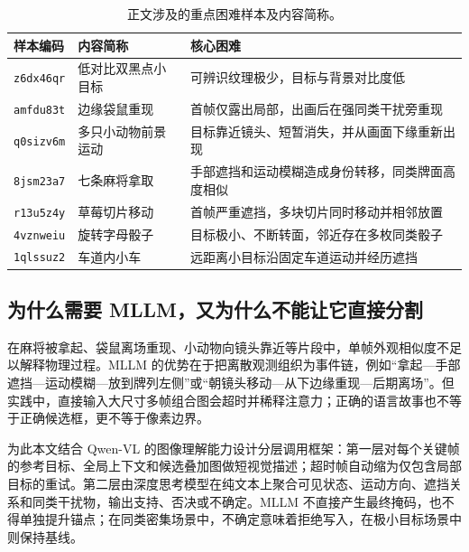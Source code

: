 \documentclass[11pt,a4paper,oneside]{ctexart}
\newcommand{\code}[1]{\texttt{#1}}
\begin{document}
\begin{table}[H]
\centering
\caption{正文涉及的重点困难样本及内容简称。}
\label{tab:video-codes}
\small
\renewcommand{\arraystretch}{1.14}
\begin{tabularx}{\textwidth}{>{\raggedright\arraybackslash}p{2.25cm} >{\raggedright\arraybackslash}p{3.8cm} >{\raggedright\arraybackslash}X}
\toprule
样本编码 & 内容简称 & 核心困难 \\
\midrule
\code{z6dx46qr} & 低对比双黑点小目标 & 可辨识纹理极少，目标与背景对比度低 \\
\code{amfdu83t} & 边缘袋鼠重现 & 首帧仅露出局部，出画后在强同类干扰旁重现 \\
\code{q0sizv6m} & 多只小动物前景运动 & 目标靠近镜头、短暂消失，并从画面下缘重新出现 \\
\code{8jsm23a7} & 七条麻将拿取 & 手部遮挡和运动模糊造成身份转移，同类牌面高度相似 \\
\code{r13u5z4y} & 草莓切片移动 & 首帧严重遮挡，多块切片同时移动并相邻放置 \\
\code{4vznweiu} & 旋转字母骰子 & 目标极小、不断转面，邻近存在多枚同类骰子 \\
\code{1qlssuz2} & 车道内小车 & 远距离小目标沿固定车道运动并经历遮挡 \\
\bottomrule
\end{tabularx}
\end{table}

\subsection{为什么需要 MLLM，又为什么不能让它直接分割}
在麻将被拿起、袋鼠离场重现、小动物向镜头靠近等片段中，单帧外观相似度不足以解释物理过程。MLLM 的优势在于把离散观测组织为事件链，例如“拿起—手部遮挡—运动模糊—放到牌列左侧”或“朝镜头移动—从下边缘重现—后期离场”。但实践中，直接输入大尺寸多帧组合图会超时并稀释注意力；正确的语言故事也不等于正确候选框，更不等于像素边界。

为此本文结合 Qwen-VL 的图像理解能力\cite{bai2025qwen25vl}设计分层调用框架：第一层对每个关键帧的参考目标、全局上下文和候选叠加图做短视觉描述；超时帧自动缩为仅包含局部目标的重试。第二层由深度思考模型在纯文本上聚合可见状态、运动方向、遮挡关系和同类干扰物，输出支持、否决或不确定。MLLM 不直接产生最终掩码，也不得单独提升锚点；在同类密集场景中，不确定意味着拒绝写入，在极小目标场景中则保持基线。
\end{document}
